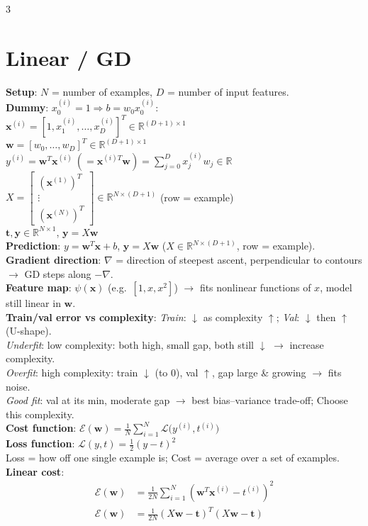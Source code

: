 \documentclass[10pt]{article}
\newcommand{\vx}{\mathbf{x}}
\newcommand{\vw}{\mathbf{w}}
\newcommand{\vt}{\mathbf{t}}
\newcommand{\cE}{\mathcal{E}}
\newcommand{\cL}{\mathcal{L}}
\newcommand{\sub}[1]{\textit{#1}:}  %
\begin{document}
\begin{multicols*}{3}
\section{Linear / GD}
\textbf{Setup}: $N$ = number of examples, $D$ = number of input features.\\
\textbf{Dummy}: $x_0^{(i)}=1\Rightarrow b=w_0x_0^{(i)}$:\\
$\vx^{(i)}=[1,x_1^{(i)},\dots,x_D^{(i)}]^T\in\mathbb R^{(D+1)\times1}$\\
$\vw=[w_0,\dots,w_D]^T\in\mathbb R^{(D+1)\times1}$\\
$y^{(i)}=\vw^T\vx^{(i)}\ (=\vx^{(i)T}\vw)=\sum_{j=0}^D x^{(i)}_jw_j\in\mathbb R$\\
$X=\begin{bmatrix}(\vx^{(1)})^T\\[-2pt]\vdots\\[-2pt](\vx^{(N)})^T\end{bmatrix}\in\mathbb R^{N\times(D+1)}$ (row = example)\\
$\vt,\mathbf y\in\mathbb R^{N\times1}$, $\mathbf y=X\vw$\\
\textbf{Prediction}: $y=\vw^T\vx+b$, $\mathbf y=X\vw$ ($X\in\mathbb R^{N\times(D+1)}$, row = example).\\
\textbf{Gradient direction}: $\nabla$ = direction of steepest ascent, perpendicular to contours $\to$ GD steps along $-\nabla$.\\
\textbf{Feature map}: $\psi(\vx)$ (e.g.\ $[1,x,x^2]$) $\to$ fits nonlinear functions of $x$, model still linear in $\vw$.\\
\textbf{Train/val error vs complexity}: \sub{Train} $\downarrow$ as complexity $\uparrow$; \sub{Val} $\downarrow$ then $\uparrow$ (U-shape).\\
\sub{Underfit} low complexity: both high, small gap, both still $\downarrow$ $\to$ increase complexity.\\
\sub{Overfit} high complexity: train $\downarrow$ (to 0), val $\uparrow$, gap large \& growing $\to$ fits noise.\\
\sub{Good fit} val at its min, moderate gap $\to$ best bias--variance trade-off; Choose this complexity.\\
\textbf{Cost function}: $\cE(\vw) = \tfrac{1}{N}\sum_{i=1}^N \cL\big(y^{(i)}, t^{(i)}\big)$\\
\textbf{Loss function}: $\cL(y,t) = \tfrac{1}{2}(y-t)^2$\\
Loss = how off one single example is; Cost = average over a set of examples.\\
\textbf{Linear cost}:
\begin{align*}
\cE(\vw) &= \frac{1}{2N}\sum_{i=1}^N\left(\vw^T\vx^{(i)} - t^{(i)}\right)^2\\
\cE(\vw) &= \frac{1}{2N}(X\vw-\vt)^T(X\vw-\vt)
\end{align*}


\end{multicols*}
\end{document}
